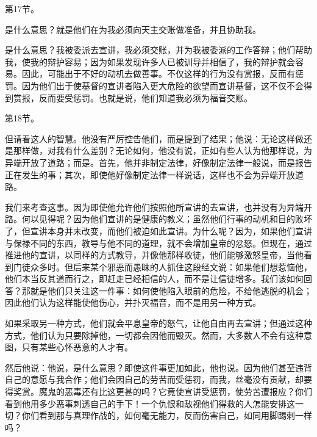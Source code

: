 第17节。\par

是什么意思？就是他们在为我必须向天主交账做准备，并且协助我。\par

是什么意思？我被委派去宣讲，我必须交账，并为我被委派的工作答辩；他们帮助我，使我的辩护容易；因为如果发现许多人已被训导并相信了，我的辩护就会容易。因此，可能出于不好的动机去做善事。不仅这样的行为没有赏报，反而有惩罚。因为他们出于使基督的宣讲者陷入更大危险的欲望而宣讲基督，这不仅不会得到赏报，反而要受惩罚。也就是说，他们知道我必须为福音交账。\par

第18节。\par

但请看这人的智慧。他没有严厉控告他们，而是提到了结果；他说：无论这样做还是那样做，对我有什么差别？无论如何，他没有说，正如有些人认为他那样说，为异端开放了道路；而是。首先，他并非制定法律，好像制定法律一般说，而是报告正在发生的事；其次，即使他好像制定法律一样说话，这样也不会为异端开放道路。\par

我们来考查这事。因为即使他允许他们按照他所宣讲的去宣讲，也并没有为异端开路。何以见得呢？因为他们宣讲的是健康的教义；虽然他们行事的动机和目的败坏了，但宣讲本身并未改变，而他们被迫如此宣讲。为什么呢？因为，如果他们宣讲与保禄不同的东西，教导与他不同的道理，就不会增加皇帝的忿怒。但现在，通过推进他的宣讲，以同样的方式教导，并像他那样收徒，他们能够激怒皇帝，当他看到门徒众多时。但后来某个邪恶而愚昧的人抓住这段经文说：如果他们想惹恼他，他们本当反其道而行之，即赶走已经相信的人，而不是让信徒增多。我们该如何回答？那就是他们只关注这一件事：如何使他陷入眼前的危险，不给他逃脱的机会；因此他们认为这样能使他伤心，并扑灭福音，而不是用另一种方式。\par

如果采取另一种方式，他们就会平息皇帝的怒气，让他自由再去宣讲；但通过这种方式，他们认为只要除掉他，一切都会因他而毁灭。然而，大多数人不会有这种意图，只有某些心怀恶意的人才有。\par

然后他说：他说，是什么意思？即使这件事更加如此，他也说。因为他们甚至违背自己的意愿与我合作；他们会因自己的劳苦而受惩罚，而我，丝毫没有贡献，却要得奖赏。魔鬼的恶毒还有比这更甚的吗？它竟使宣讲受惩罚，使劳苦遭报应？你们看到他用多少恶事刺透自己的手下！一个仇恨和敌视他们得救的人怎能安排这一切？你们看到那与真理作战的，如何毫无能力，反而伤害自己，如同用脚踢刺一样吗？\par

